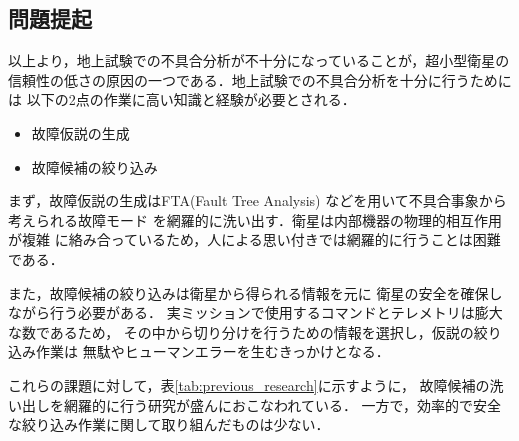 \documentclass[11pt]{jsarticle}%
\begin{document}
\begin{multicols}{2}
  \subsection{問題提起}
  \vspace{-2zh}
  以上より，地上試験での不具合分析が不十分になっていることが，超小型衛星の
  信頼性の低さの原因の一つである．地上試験での不具合分析を十分に行うためには
  以下の2点の作業に高い知識と経験が必要とされる．
  \begin{itemize}
    \item 故障仮説の生成
    \item 故障候補の絞り込み%
  \end{itemize}

  まず，故障仮説の生成はFTA(Fault Tree Analysis)%
  などを用いて不具合事象から考えられる故障モード
  を網羅的に洗い出す．衛星は内部機器の物理的相互作用が複雑
  に絡み合っているため，人による思い付きでは網羅的に行うことは困難である．

  また，故障候補の絞り込みは衛星から得られる情報を元に
  衛星の安全を確保しながら行う必要がある．
  実ミッションで使用するコマンドとテレメトリは膨大な数であるため，
その中から切り分けを行うための情報を選択し，仮説の絞り込み作業は
無駄やヒューマンエラーを生むきっかけとなる．

これらの課題に対して，表\ref{tab:previous_research}に示すように，
故障候補の洗い出しを網羅的に行う研究が盛んにおこなわれている．
一方で，効率的で安全な絞り込み作業に関して取り組んだものは少ない．
\vspace{-1zh}
\begin{table}[H]
  \centering
  \caption{不具合分析手法の比較}
  \label{tab:previous_research}
\end{table}
\vspace{-1zh}

\end{multicols}
\end{document}
